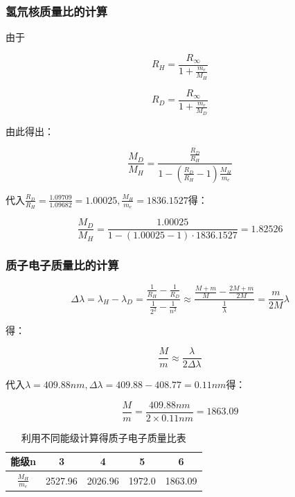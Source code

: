 \documentclass[a4paper,UTF8]{ctexart}
\begin{document}
\subsubsection{氢氘核质量比的计算}

由于

\begin{equation}
    R_{H} = \frac{R_{\infty}}{1+\frac{m_{e}}{M_{H}}}
\end{equation}

\begin{equation}
    R_{D} = \frac{R_{\infty}}{1+\frac{m_{e}}{M_{D}}}
\end{equation}

由此得出：

\begin{equation}
    \frac{M_{D}}{M_{H}} = \frac{\frac{R_{D}}{R_{H}}}{1-(\frac{R_{D}}{R_{H}}-1)\frac{M_{H}}{m_{e}}}
\end{equation}

代入$\frac{R_D}{R_H} = \frac{1.09709}{1.09682} =1.00025,\frac{M_H}{m_e} = 1836.1527$得：

\begin{equation}
    \frac{M_D}{M_H} = \frac{1.00025}{1-(1.00025-1)\cdot 1836.1527} = 1.82526
\end{equation}

\subsubsection{质子电子质量比的计算}

\begin{equation}
    \Delta \lambda = \lambda_{H} - \lambda_{D} = \frac{\frac{1}{R_{H}}-\frac{1}{R_{D}}}{\frac{1}{2^2}-\frac{1}{n^2}} \approx \frac{\frac{M+m}{M}-\frac{2M+m}{2M}}{\frac{1}{\lambda}} = \frac{m}{2M} \lambda
\end{equation}

得：

\begin{equation}
    \frac{M}{m} \approx \frac{\lambda}{2 \Delta \lambda}
\end{equation}

代入$\lambda = 409.88nm, \Delta \lambda = 409.88-408.77 = 0.11nm$得：

\begin{equation}
    \frac{M}{m} = \frac{409.88nm}{2\times 0.11nm} = 1863.09
\end{equation}

\begin{table}[H]
    \centering
    \begin{tabular}{|c|c|c|c|c|}
    \hline
        能级n & 3 & 4 & 5 & 6 \\ \hline
        $\frac{M_{H}}{m_{e}}$ & 2527.96 & 2026.96 & 1972.0 & 1863.09 \\ \hline
    \end{tabular}
    \caption{利用不同能级计算得质子电子质量比表}
\end{table}
\end{document}
